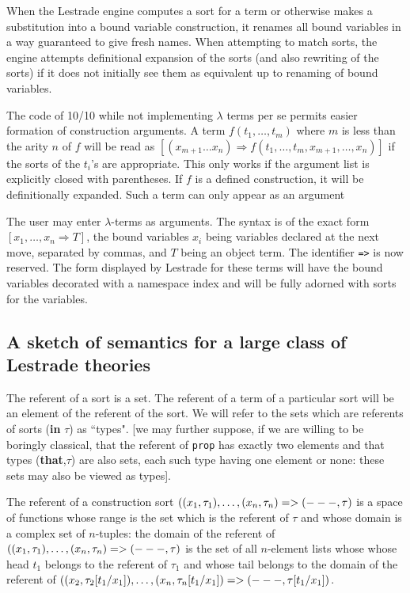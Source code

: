 \documentclass[12pt]{article}
\begin{document}
When the Lestrade engine computes a sort for a term or otherwise makes a substitution into a bound variable construction, it renames all bound variables in a way guaranteed to give fresh names.   When attempting to match sorts, the engine attempts definitional expansion of the sorts (and also rewriting of the sorts) if it does not initially see them as equivalent up to renaming of bound variables.

 The code of 10/10 while not implementing $\lambda$ terms per se permits easier formation of construction arguments.
A term $f(t_1,\ldots,t_m)$ where $m$ is less than the arity $n$ of $f$ will be read as $[(x_{m+1}\ldots x_n) \Rightarrow f(t_1,\ldots,t_m,x_{m+1},\dots,x_n)]$ if the sorts of the $t_i$'s are appropriate.  This only works if the argument list is explicitly closed with parentheses.  If $f$ is a defined construction, it will be definitionally expanded.   Such a term can only appear as an argument

  The user may enter $\lambda$-terms as arguments.  The syntax is of the exact form $[x_1,\ldots,x_n \Rightarrow T]$, the bound variables $x_i$ being variables declared at the next move, separated by commas, and $T$ being an object term.  The identifier {\tt =>} is now reserved.  The form displayed by Lestrade for these terms will have the bound variables decorated with a namespace index and will be fully adorned with sorts for the variables.
\newpage

\subsection{A sketch of semantics for a large class of  Lestrade theories}

The referent of a sort is a set.   The referent of a term of a particular sort will be an element of the referent of the sort.  We will refer to the sets which are referents of sorts ({\bf in} $\tau$) as ``types".  [we may further suppose, if we are willing to be boringly classical,  that the referent of {\tt prop} has exactly two elements and that types ({\bf that},$\tau$) are also sets, each such type having one element or none:  these sets may also be viewed as types].

The referent of a construction sort $((x_1,\tau_1),\ldots,(x_n,\tau_n) => ({\bf ---},\tau)$ is a space of functions whose range is the set which is the referent of $\tau$
and whose domain is a complex set of $n$-tuples:  the domain of the referent of $((x_1,\tau_1),\ldots,(x_n,\tau_n) => ({\bf ---},\tau)$ is the set of all $n$-element lists whose
whose head $t_1$ belongs to the referent of $\tau_1$ and whose tail belongs to the domain of the referent of $((x_2,\tau_2[t_1/x_1]),\ldots,(x_n,\tau_n[t_1/x_1]) => ({\bf ---},\tau[t_1/x_1])$.
\end{document}
